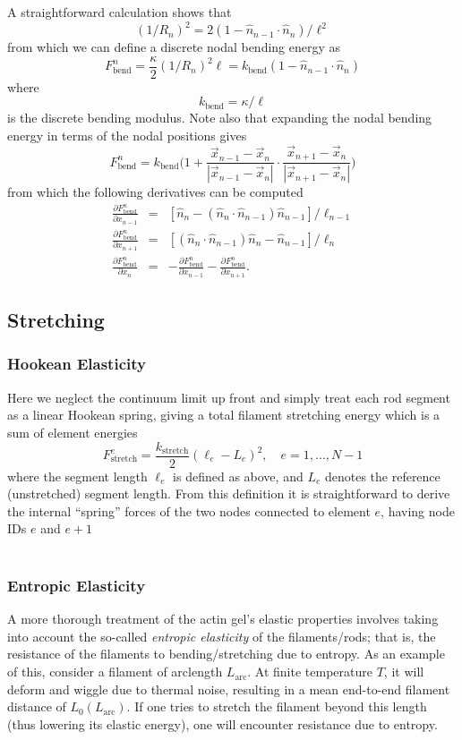 \documentclass[pre,floatfix,twocolumn]{revtex4}
\begin{document}
A straightforward calculation shows that 
\[
(1/R_n)^2 = 2 (1-\hat{n}_{n-1}\cdot\hat{n}_n)/\ell^2
\]
from which we can define a discrete nodal bending energy as
\[
F_\text{bend}^n = \frac{\kappa}{2} (1/R_n)^2 \ell =  k_\text{bend} (1-\hat{n}_{n-1}\cdot\hat{n}_n)
\]
where 
\[
k_\text{bend}  = \kappa /\ell
\]
is the discrete bending modulus.  Note also that expanding the nodal bending energy in terms of the nodal positions gives
\[
F_\text{bend}^n =  k_\text{bend} \Big(1+\frac{\vec{x}_{n-1}-\vec{x}_n}{|\vec{x}_{n-1}-\vec{x}_n|}\cdot\frac{\vec{x}_{n+1}-\vec{x}_n}{|\vec{x}_{n+1}-\vec{x}_n|}\Big)
\]
from which the following derivatives can be computed
\begin{eqnarray*}
\frac{\partial F_\text{bend}^n }{\partial x_{n-1}} &=& [ \hat{n}_{n} - (\hat{n}_{n}\cdot\hat{n}_{n-1})\hat{n}_{n-1}] /{\ell_{n-1}}\\
\frac{\partial F_\text{bend}^n }{\partial x_{n+1}} &=& [ (\hat{n}_{n}\cdot\hat{n}_{n-1})\hat{n}_{n}-\hat{n}_{n-1} ] /  {\ell_{n}} \\
\frac{\partial F_\text{bend}^n }{\partial x_{n}} &=& - \frac{\partial F_\text{bend}^n }{\partial x_{n-1}} - \frac{\partial F_\text{bend}^n }{\partial x_{n+1}} .
\end{eqnarray*}

\subsection{Stretching}
\subsubsection{Hookean Elasticity}
Here we neglect the continuum limit up front and simply treat each rod segment as a linear Hookean spring, giving a total filament stretching energy which is a sum of element energies
\[
F_\text{stretch}^e = \frac{k_\text{stretch}}{2} (\ell_e - L_e )^2 , \quad e=1,\dots,N-1
\]
where the segment length $\ell_e$ is defined as above, and $L_e$ denotes the reference (unstretched) segment length.  From this definition it is straightforward to derive the internal ``spring'' forces of the two nodes connected to element $e$, having node IDs $e$ and $e+1$
\[
\frac{}{}
\]

\subsubsection{Entropic Elasticity}
A more thorough treatment of the actin gel's elastic properties involves taking into account the so-called \emph{entropic elasticity} of the filaments/rods; that is, the resistance of the filaments to bending/stretching due to entropy.  As an example of this, consider a filament of arclength $L_{\text{arc}}$.  At finite temperature $T$, it will deform and wiggle due to thermal noise, resulting in a mean end-to-end filament distance of $L_{0}(L_{\text{arc}})$.  If one tries to stretch the filament beyond this length (thus lowering its elastic energy), one will encounter resistance due to entropy.  
\end{document}
